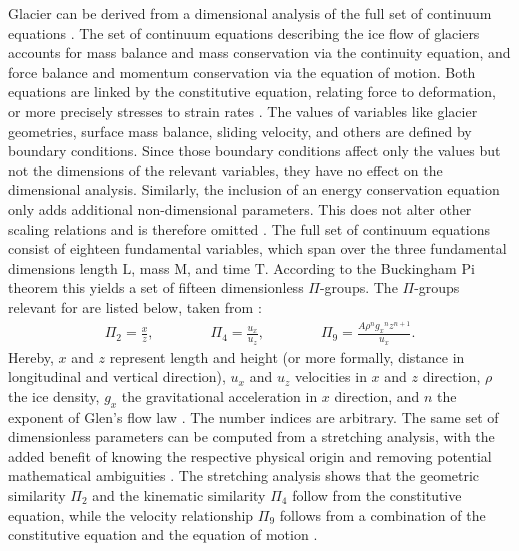             Glacier \vas{} can be derived from a dimensional analysis of the full set of continuum equations \citep{Bahr1997b, Bahr2015}. The set of continuum equations describing the ice flow of glaciers accounts for mass balance and mass conservation via the continuity equation, and force balance and momentum conservation via the equation of motion. Both equations are linked by the constitutive equation, relating force to deformation, or more precisely stresses to strain rates \citep[e.g.,][]{CuffeyPaterson2010}. The values of variables like glacier geometries, surface mass balance, sliding velocity, and others are defined by boundary conditions. Since those boundary conditions affect only the values but not the dimensions of the relevant variables, they have no effect on the dimensional analysis. Similarly, the inclusion of an energy conservation equation only adds additional non-dimensional parameters. This does not alter other scaling relations and is therefore omitted \citep{Bahr2015}. The full set of continuum equations consist of eighteen fundamental variables, which span over the three fundamental dimensions length $\mathrm{L}$, mass $\mathrm{M}$, and time $\mathrm{T}$. According to the Buckingham Pi theorem \citep[e.g.,][]{Evans1972, Yarin2012} this yields a set of fifteen dimensionless $\Pi$-groups. The $\Pi$-groups relevant for \vas{} are listed below, taken from \citet[Section 4.1, Eq. 26, 28 \& 33]{Bahr2015}:
            \begin{align}
                \Pi_2 = \frac{x}{z}, \qquad\qquad
                \Pi_4 = \frac{u_x}{u_z}, \qquad\qquad
                \Pi_9 = \frac{A\rho^n{g_x}^nz^{n+1}}{u_x}.
            \end{align}
            Hereby, $x$ and $z$ represent length and height (or more formally, distance in longitudinal and vertical direction), $u_x$ and $u_z$ velocities in $x$ and $z$ direction, $\rho$ the ice density, $g_x$ the gravitational acceleration in $x$ direction, and $n$ the exponent of Glen's flow law \citep[e.g.,][Chapter 3.4.4]{CuffeyPaterson2010}. The number indices are arbitrary.
            The same set of dimensionless parameters can be computed from a stretching analysis, with the added benefit of knowing the respective physical origin and removing potential mathematical ambiguities \citep[Section 5]{Bahr2015}. The stretching analysis shows that the geometric similarity $\Pi_2$ and the kinematic similarity $\Pi_4$ follow from the constitutive equation, while the velocity relationship $\Pi_9$ follows from a combination of the constitutive equation and the equation of motion \citep[Section 6]{Bahr2015}.

